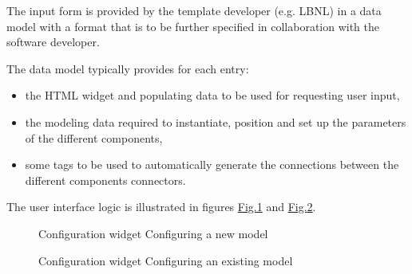 \documentclass[letterpaper,10pt, openany,english]{sphinxmanual}
\begin{document}
The input form is provided by the template developer (e.g. LBNL) in a data model with a format that is to be further specified in collaboration with the software developer.

The data model typically provides for each entry:
\begin{itemize}
\item {} 
the HTML widget and populating data to be used for requesting user input,

\item {} 
the modeling data required to instantiate, position and set up the parameters of the different components,

\item {} 
some tags to be used to automatically generate the connections between the different components connectors.

\end{itemize}

The user interface logic is illustrated in figures \hyperref[\detokenize{requirements:screen-conf-0}]{Fig.\@ \ref{\detokenize{requirements:screen-conf-0}}} and \hyperref[\detokenize{requirements:screen-conf-1}]{Fig.\@ \ref{\detokenize{requirements:screen-conf-1}}}.

\begin{figure}[htbp]
\centering
\capstart

\noindent{}
\caption{Configuration widget \textendash{} Configuring a new model}\label{\detokenize{requirements:screen-conf-0}}\end{figure}

\begin{figure}[htbp]
\centering
\capstart

\noindent{}
\caption{Configuration widget \textendash{} Configuring an existing model}\label{\detokenize{requirements:screen-conf-1}}\end{figure}
\end{document}
